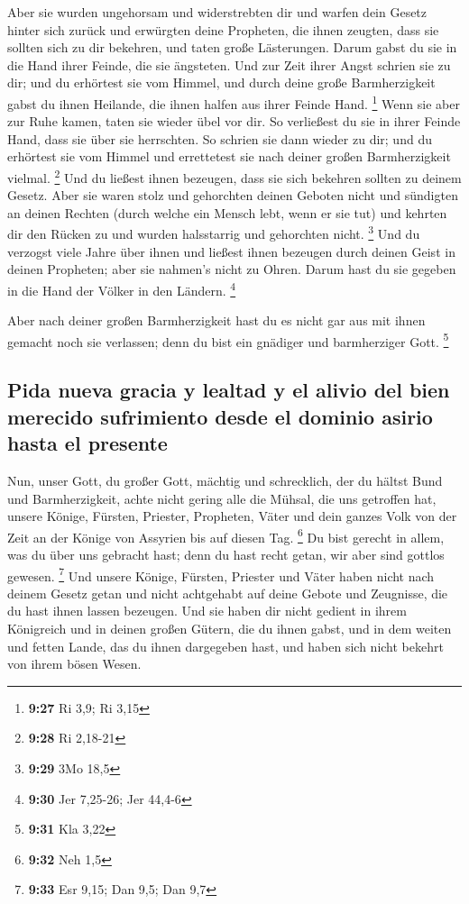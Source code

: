  Aber sie wurden ungehorsam und widerstrebten dir und
warfen dein Gesetz hinter sich zurück und erwürgten deine Propheten, die
ihnen zeugten, dass sie sollten sich zu dir bekehren, und taten große
Lästerungen.  Darum gabst du sie in die Hand ihrer
Feinde, die sie ängsteten. Und zur Zeit ihrer Angst schrien sie zu dir;
und du erhörtest sie vom Himmel, und durch deine große Barmherzigkeit
gabst du ihnen Heilande, die ihnen halfen aus ihrer Feinde Hand.
\footnote{\textbf{9:27} Ri 3,9; Ri 3,15}  Wenn sie aber
zur Ruhe kamen, taten sie wieder übel vor dir. So verließest du sie in
ihrer Feinde Hand, dass sie über sie herrschten. So schrien sie dann
wieder zu dir; und du erhörtest sie vom Himmel und errettetest sie nach
deiner großen Barmherzigkeit vielmal. \footnote{\textbf{9:28} Ri 2,18-21}
 Und du ließest ihnen bezeugen, dass sie sich bekehren
sollten zu deinem Gesetz. Aber sie waren stolz und gehorchten deinen
Geboten nicht und sündigten an deinen Rechten (durch welche ein Mensch
lebt, wenn er sie tut) und kehrten dir den Rücken zu und wurden
halsstarrig und gehorchten nicht. \footnote{\textbf{9:29} 3Mo 18,5}
 Und du verzogst viele Jahre über ihnen und ließest ihnen
bezeugen durch deinen Geist in deinen Propheten; aber sie nahmen's nicht
zu Ohren. Darum hast du sie gegeben in die Hand der Völker in den
Ländern. \footnote{\textbf{9:30} Jer 7,25-26; Jer 44,4-6}

 Aber nach deiner großen Barmherzigkeit hast du es nicht
gar aus mit ihnen gemacht noch sie verlassen; denn du bist ein gnädiger
und barmherziger Gott. \footnote{\textbf{9:31} Kla 3,22}

\hypertarget{pida-nueva-gracia-y-lealtad-y-el-alivio-del-bien-merecido-sufrimiento-desde-el-dominio-asirio-hasta-el-presente}{%
\subsection{Pida nueva gracia y lealtad y el alivio del bien merecido
sufrimiento desde el dominio asirio hasta el
presente}\label{pida-nueva-gracia-y-lealtad-y-el-alivio-del-bien-merecido-sufrimiento-desde-el-dominio-asirio-hasta-el-presente}}

 Nun, unser Gott, du großer Gott, mächtig und
schrecklich, der du hältst Bund und Barmherzigkeit, achte nicht gering
alle die Mühsal, die uns getroffen hat, unsere Könige, Fürsten,
Priester, Propheten, Väter und dein ganzes Volk von der Zeit an der
Könige von Assyrien bis auf diesen Tag. \footnote{\textbf{9:32} Neh 1,5}
 Du bist gerecht in allem, was du über uns gebracht hast;
denn du hast recht getan, wir aber sind gottlos gewesen. \footnote{\textbf{9:33}
  Esr 9,15; Dan 9,5; Dan 9,7}  Und unsere Könige,
Fürsten, Priester und Väter haben nicht nach deinem Gesetz getan und
nicht achtgehabt auf deine Gebote und Zeugnisse, die du hast ihnen
lassen bezeugen.  Und sie haben dir nicht gedient in
ihrem Königreich und in deinen großen Gütern, die du ihnen gabst, und in
dem weiten und fetten Lande, das du ihnen dargegeben hast, und haben
sich nicht bekehrt von ihrem bösen Wesen.

